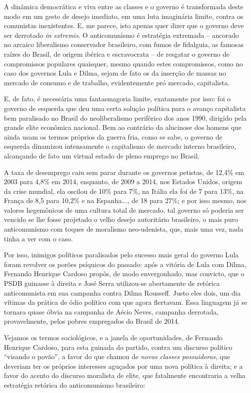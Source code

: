 A dinâmica democrática e viva entre as classes e o governo é
transformada deste modo em um gesto de desejo imediato, em uma luta
imaginária limite, contra os comunistas inexistentes. E, me parece, isto
apenas quer dizer que o governo deve ser derrotado \emph{in extremis}. O
anticomunismo é estratégia extremada -- ancorado no arcaico liberalismo
conservador brasileiro, com fumos de fidalguia, as famosas raízes do
Brasil, de origem ibérica e escravocrata -- de resgatar o governo de
compromissos populares quaisquer, mesmo quando estes compromissos, como
no caso dos governos Lula e Dilma, sejam de fato os da inserção de
massas no mercado de consumo e de trabalho, evidentemente pró mercado,
capitalista.

E, de fato, é necessária uma fantasmagoria limite, exatamente por isso:
foi o governo de esquerda que deu uma certa solução política para o
avanço capitalista bem paralisado no Brasil do neoliberalismo periférico
dos anos 1990, dirigido pela grande elite econômica nacional. Bem ao
contrário da alucinose dos homens que ainda usam os termos próprios da
guerra fria, como se sabe, o governo de esquerda dinamizou intensamente
o capitalismo de mercado interno brasileiro, alcançando de fato um
virtual estado de pleno emprego no Brasil.

A taxa de desemprego caiu sem parar durante os governos petistas, de
12,4\% em 2003 para 4,8\% em 2014, enquanto, de 2009 a 2014, nos Estados
Unidos, origem da crise mundial, ela oscilou de 10\% para 7\%, na Itália
ela foi de 7 para 13\%, na França de 8,5 para 10,2\% e na Espanha..., de
18 para 27\%; e por isso mesmo, nos valores hegemônicos de uma cultura
total de mercado, tal governo só poderia ser vencido se lhe fosse
projetado o velho desejo autoritário brasileiro, o mais puro
anticomunismo com toques de moralismo neo-udenista, que, mais uma vez,
nada tinha a ver com o caso.

Por isso, inimigos políticos paralisados pelo sucesso mais geral do
governo Lula foram revolver os porões psíquicos do passado: após a
vitória de Lula com Dilma, Fernando Henrique Cardoso propôs, de modo
envergonhado, mas convicto, que o PSDB guinasse à direita e José Serra
utilizou-se abertamente de retórica anticomunista em sua campanha contra
Dilma Rousseff. Justo eles dois, um dia vítimas da prática de ódio
político com que agora flertavam. Essa linguagem já se tornara quase
óbvia na campanha de Aécio Neves, campanha derrotada, provavelmente,
pelos pobres empregados do Brasil de 2014.

Vejamos os termos sociológicos, e a janela de oportunidades, de Fernando
Henrique Cardoso, para esta guinada do partido, contra um discurso
político ``visando o povão'', a favor do que chamou de \emph{novas
classes possuidoras}, que deveriam ter os próprios interesses aguçados
por uma nova política à direita; e a favor do acento do discurso
moralista de elite, que fatalmente encontraria a velha estratégia
retórica do anticomunismo brasileiro:

